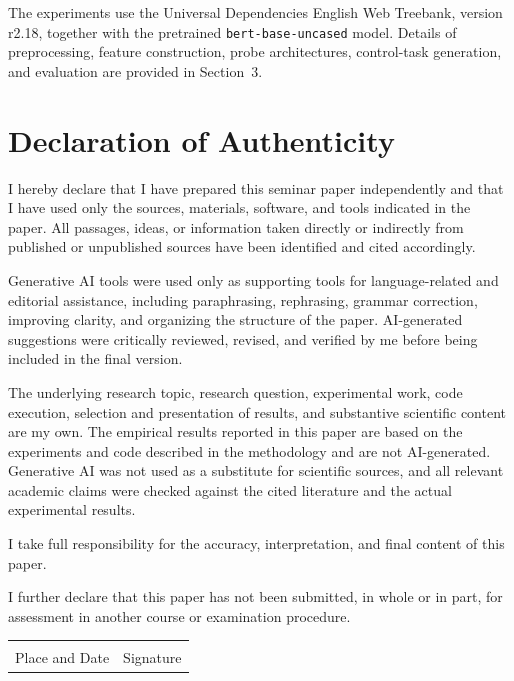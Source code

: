 \documentclass[12pt,a4paper]{article}
\begin{document}
The experiments use the Universal Dependencies English Web Treebank, version r2.18, together with the pretrained \texttt{bert-base-uncased} model. Details of preprocessing, feature construction, probe architectures, control-task generation, and evaluation are provided in Section~3.


\clearpage

\section*{Declaration of Authenticity}

I hereby declare that I have prepared this seminar paper independently and that I have used only the sources, materials, software, and tools indicated in the paper. All passages, ideas, or information taken directly or indirectly from published or unpublished sources have been identified and cited accordingly.

Generative AI tools were used only as supporting tools for language-related and editorial assistance, including paraphrasing, rephrasing, grammar correction, improving clarity, and organizing the structure of the paper. AI-generated suggestions were critically reviewed, revised, and verified by me before being included in the final version.

The underlying research topic, research question, experimental work, code execution, selection and presentation of results, and substantive scientific content are my own. The empirical results reported in this paper are based on the experiments and code described in the methodology and are not AI-generated. Generative AI was not used as a substitute for scientific sources, and all relevant academic claims were checked against the cited literature and the actual experimental results.

I take full responsibility for the accuracy, interpretation, and final content of this paper.

I further declare that this paper has not been submitted, in whole or in part, for assessment in another course or examination procedure.

\vspace{2.5cm}

\noindent
\begin{tabular}{p{6cm} p{6cm}}
\hrulefill & \hrulefill \\
Place and Date & Signature \\
\end{tabular}
\end{document}
